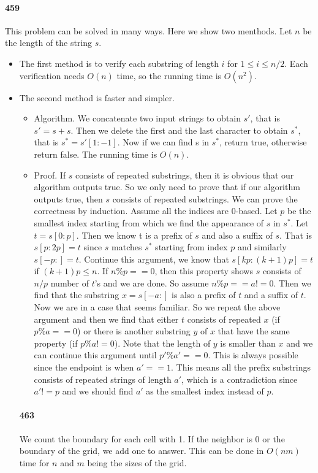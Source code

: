 \documentclass[11pt]{article}
\begin{document}
\paragraph{459}
This problem can be solved in many ways. Here we show two menthods. Let $n$ be the length of the string $s$.
\begin{itemize}
\item The first method is to verify each substring of length $i$ for $1 \le i \le n/2$. Each verification needs $O(n)$ time,
so the running time is $O(n^2)$.
\item The second method is faster and simpler. 
\begin{itemize}
\item Algorithm. We concatenate two input strings to obtain $s'$, that is $s' = s + s$.
Then we delete the first and the last character to obtain $s^*$, that is $s^* = s'[1:-1]$. Now if we can find s in $s^*$,
return true, otherwise return false. The running time is $O(n)$. 
\item Proof. If $s$ consists of repeated substrings, then it is obvious that our algorithm outputs true. So we only need 
to prove that if our algorithm outputs true, then $s$ consists of repeated substrings. We can prove the correctness by 
induction. Assume all the indices are 0-based. Let $p$ be the smallest index starting from which we find the appearance of 
$s$ in $s^*$. Let $t = s[0:p]$. Then we know t is a prefix of $s$ and also a suffix of $s$. That is $s[p:2p] = 
t$ since $s$ matches $s^*$ starting from index $p$ and similarly $s[-p:] = t$. Continue this argument, we know that
$s[kp:(k+1)p] = t$ if $(k+1)p \le n$. If $n \% p == 0$, then this property shows $s$ consists of $n/p$ number of $t$'s 
and we are done. So assume $n \% p == a != 0$. Then we find that the substring $x = s[-a:]$ is also a prefix of $t$ and a 
suffix of $t$. Now we are in a case that seems familiar. So we repeat the above argument and then we find that either $t$ 
consists of repeated $x$ (if $p \% a == 0$) or there is another substring $y$ of $x$ that have the same property (if $p \% a
!= 0$). Note that the length of $y$ is smaller than $x$ and we can continue this argument until $p' \% a' == 0$. This is 
always possible since the endpoint is when $a' == 1$. This means all the prefix substrings consists of repeated strings of 
length $a'$, which is a contradiction since $a' != p$ and we should find $a'$ as the smallest index instead of $p$.
\end{itemize}

\paragraph{463}
We count the boundary for each cell with 1. If the neighbor is 0 or the boundary of the grid, we add one to answer.
This can be done in $O(nm)$ time for $n$ and $m$ being the sizes of the grid.


\end{itemize}
\end{document}
